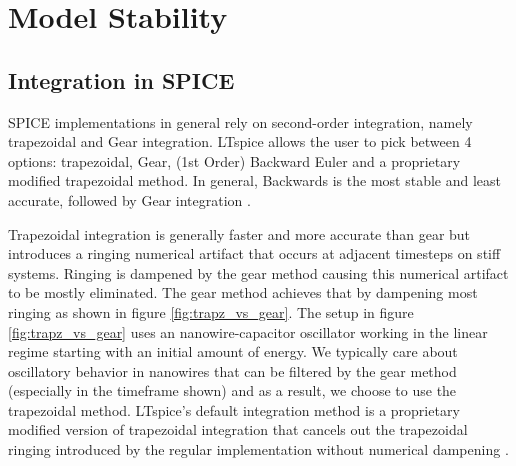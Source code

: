 \section{Model Stability} \label{stability}

\subsection{Integration in SPICE}

SPICE implementations in general rely on second-order integration, namely trapezoidal and Gear integration. LTspice allows the user to pick between 4 options: trapezoidal,
Gear, (1st Order) Backward Euler and a proprietary modified trapezoidal method. In general,
Backwards is the most stable and least accurate, followed by Gear integration 
\cite{ltspice-diff-post, spice-book}.

Trapezoidal integration is generally faster and more accurate than gear but introduces a ringing
numerical artifact that occurs at adjacent timesteps on stiff systems. Ringing is dampened by the gear
method causing this numerical artifact to be mostly eliminated. The gear method achieves that by
dampening most ringing as shown in figure \ref{fig:trapz_vs_gear}. The setup in figure \ref{fig:trapz_vs_gear} uses an nanowire-capacitor oscillator working in the linear regime starting
with an initial amount of energy.
We typically care about oscillatory behavior in nanowires that can be filtered by the gear
method (especially in the timeframe shown)
and as a result, we choose to use the trapezoidal method. LTspice's 
default integration method is a proprietary modified version of trapezoidal integration 
that cancels out the trapezoidal ringing introduced by the regular implementation without
numerical dampening \cite{ltspice-diff-post}. 


